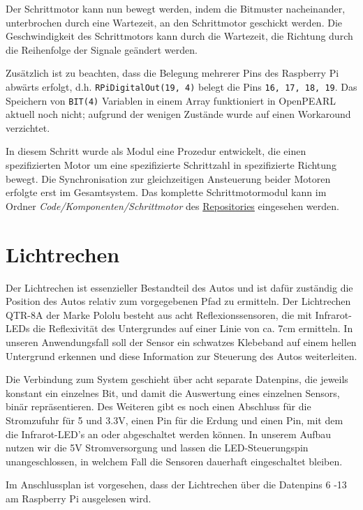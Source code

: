 Der Schrittmotor kann nun bewegt werden, indem die Bitmuster nacheinander, unterbrochen durch eine Wartezeit, an den Schrittmotor geschickt werden. 
Die Geschwindigkeit des Schrittmotors kann durch die Wartezeit, die Richtung durch die Reihenfolge der Signale geändert werden.

Zusätzlich ist zu beachten, dass die Belegung mehrerer Pins des Raspberry Pi abwärts erfolgt, d.h. \texttt{RPiDigitalOut(19, 4)} belegt die Pins \texttt{16, 17, 18, 19}. 
Das Speichern von \texttt{BIT(4)} Variablen in einem Array funktioniert in OpenPEARL aktuell noch nicht; aufgrund der wenigen Zustände wurde auf einen Workaround verzichtet.

In diesem Schritt wurde als Modul eine Prozedur entwickelt, die einen spezifizierten Motor um eine spezifizierte Schrittzahl in spezifizierte Richtung bewegt. Die Synchronisation zur gleichzeitigen Ansteuerung beider Motoren erfolgte erst im Gesamtsystem. Das komplette Schrittmotormodul kann im Ordner \emph{Code/Komponenten/Schrittmotor} des \href{https://github.com/OpenPearl-HFUWPV1718/SensorCar}{Repositories} eingesehen werden.\\


\section{Lichtrechen}
Der Lichtrechen ist essenzieller Bestandteil des Autos und ist dafür zuständig die Position des Autos relativ zum vorgegebenen Pfad zu ermitteln. Der Lichtrechen QTR-8A der Marke Pololu besteht aus acht Reflexionssensoren, die mit Infrarot-LEDs die Reflexivität des Untergrundes auf einer Linie von ca. 7cm ermitteln. In unseren Anwendungsfall soll der Sensor ein schwatzes Klebeband auf einem hellen Untergrund erkennen und diese Information zur Steuerung des Autos weiterleiten. 

Die Verbindung zum System geschieht über acht separate Datenpins, die jeweils konstant ein einzelnes Bit, und damit die Auswertung eines einzelnen Sensors, binär repräsentieren. Des Weiteren gibt es noch einen Abschluss für die Stromzufuhr für 5 und 3.3V, einen Pin für die Erdung und einen Pin, mit dem die Infrarot-LED’s an oder abgeschaltet werden können. In unserem Aufbau nutzen wir die 5V Stromversorgung und lassen die LED-Steuerungspin unangeschlossen, in welchem Fall die Sensoren dauerhaft eingeschaltet bleiben. 

Im Anschlussplan ist vorgesehen, dass der Lichtrechen über die Datenpins 6 -13 am Raspberry Pi ausgelesen wird.

